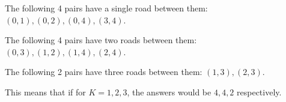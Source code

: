 The following 4 pairs have a single road between them: $(0, 1), (0, 2), (0, 4), (3, 4)$.

The following 4 pairs have two roads between them: $(0, 3), (1, 2), (1, 4), (2, 4)$.

The following 2 pairs have three roads between them: $(1, 3), (2, 3)$.

This means that if for $K = 1, 2, 3$, the answers would be $4, 4, 2$ respectively.
